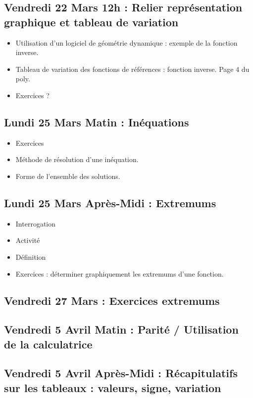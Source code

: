 \documentclass{article}
\begin{document}
\subsection*{Vendredi 22 Mars 12h : Relier représentation graphique et tableau de variation}
\begin{itemize}
\item Utilisation d'un logiciel de géométrie dynamique : exemple de la fonction inverse.
\item Tableau de variation des fonctions de références : fonction inverse. Page 4 du poly.
\item Exercices ?
\end{itemize}
\subsection*{Lundi 25 Mars Matin : Inéquations}
\begin{itemize}
\item Exercices
\item Méthode de résolution d'une inéquation.
\item Forme de l'ensemble des solutions. 
\end{itemize}
\subsection*{Lundi 25 Mars Après-Midi : Extremums}
\begin{itemize}
\item Interrogation 
\item Activité
\item Définition
\item Exercices : déterminer graphiquement les extremums d'une fonction.
\end{itemize}
\subsection*{Vendredi 27 Mars : Exercices extremums}
\subsection*{Vendredi 5 Avril Matin : Parité / Utilisation de la calculatrice}
\subsection*{Vendredi 5 Avril Après-Midi : Récapitulatifs sur les tableaux : valeurs, signe, variation}
\end{document}
